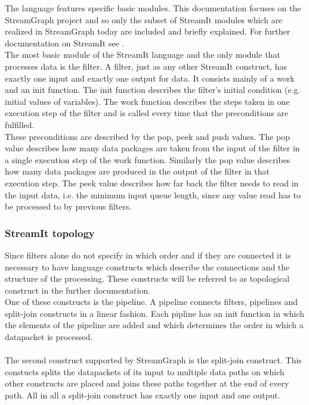 \documentclass[journal]{IEEEtran}
\begin{document}
The language features specific basic modules. This documentation focuses on the
StreamGraph project and so only the subset of StreamIt modules which are
realized in StreamGraph today are included and briefly explained. For further
documentation on StreamIt see \cite{streamIt}.\\

The most basic module of the StreamIt language and the only module that
processes data is the filter. A filter, just as any other StreamIt construct,
has exactly one input and exactly one output for data. It consists mainly of a
work and an init function. The init function describes the filter's initial
condition (e.g. initial values of variables). The work function describes the
steps taken in one execution step of the filter and is called every time that
the preconditions are fulfilled.\\

These preconditions are described by the pop, peek and push values. The pop
value describes how many data packages are taken from the input of the filter in
a single execution step of the work function. Similarly the pop value describes
how many data packages are produced in the output of the filter in that
execution step. The peek value describes how far back the filter needs to read
in the input data, i.e. the minimum input queue length, since any value read has
to be processed to by previous filters.


\subsubsection{StreamIt topology}
\label{StreamItTopology}
\noindent Since filters alone do not specify in which order and if they are
connected it is necessary to have language constructs which describe the
connections and the structure of the processing. These constructs will be
referred to as topological construct in the further documentation.\\

One of these constructs is the pipeline. A pipeline connects filters, pipelines
and split-join constructs in a linear fashion. Each pipline has an init function
in which the elements of the pipeline are added and which determines the order
in which a datapacket is processed.\\
\\

The second construct supported by StreamGraph is the split-join construct. This
constucts splits the datapackets of its input to multiple data paths on which
other constructs are placed and joins these paths together at the end of every
path. All in all a split-join construct has exactly one input and one output.\\
\\
\end{document}
